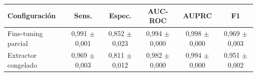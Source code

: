 \begin{tabular}{lccccc}
\toprule
Configuración & Sens. & Espec. & AUC-ROC & AUPRC & F1 \\ 
\midrule
Fine-tuning parcial & 0,991 $\pm$ 0,001 & 0,852 $\pm$ 0,023 & 0,994 $\pm$ 0,000 & 0,998 $\pm$ 0,000 & 0,969 $\pm$ 0,003 \\
Extractor congelado & 0,969 $\pm$ 0,003 & 0,811 $\pm$ 0,012 & 0,982 $\pm$ 0,000 & 0,994 $\pm$ 0,000 & 0,951 $\pm$ 0,002 \\
\bottomrule
\end{tabular}